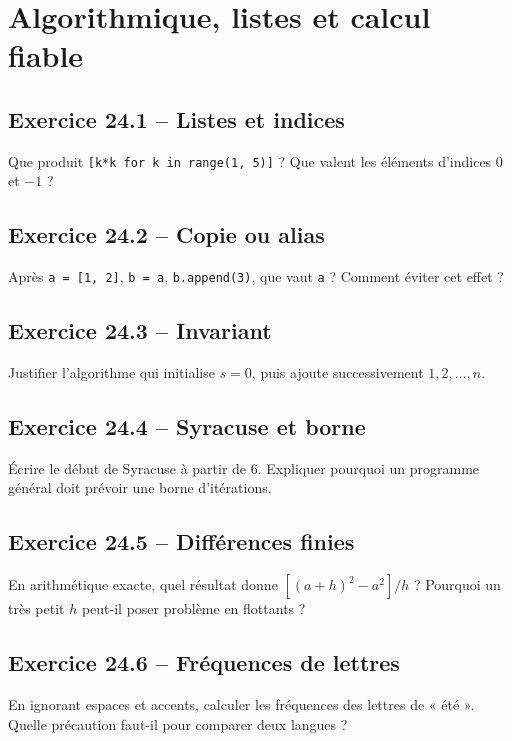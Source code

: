 \chapter{Algorithmique, listes et calcul fiable}
\section*{Exercice 24.1 -- Listes et indices}
Que produit \texttt{[k*k for k in range(1, 5)]} ? Que valent les éléments d'indices $0$ et $-1$ ?

\section*{Exercice 24.2 -- Copie ou alias}
Après \texttt{a = [1, 2]}, \texttt{b = a}, \texttt{b.append(3)}, que vaut \texttt{a} ? Comment éviter cet effet ?

\section*{Exercice 24.3 -- Invariant}
Justifier l'algorithme qui initialise $s=0$, puis ajoute successivement $1,2,\ldots,n$.

\section*{Exercice 24.4 -- Syracuse et borne}
Écrire le début de Syracuse à partir de $6$. Expliquer pourquoi un programme général doit prévoir une borne d'itérations.

\section*{Exercice 24.5 -- Différences finies}
En arithmétique exacte, quel résultat donne $[(a+h)^2-a^2]/h$ ? Pourquoi un très petit $h$ peut-il poser problème en flottants ?

\section*{Exercice 24.6 -- Fréquences de lettres}
En ignorant espaces et accents, calculer les fréquences des lettres de « été ». Quelle précaution faut-il pour comparer deux langues ?
